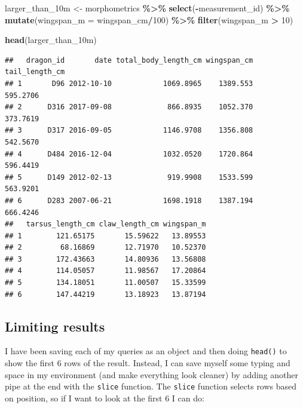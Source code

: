 \documentclass[
]{book}
\newenvironment{Shaded}{\begin{snugshade}}{\end{snugshade}}
\newcommand{\AttributeTok}[1]{\textcolor[rgb]{0.13,0.29,0.53}{#1}}
\newcommand{\DecValTok}[1]{\textcolor[rgb]{0.00,0.00,0.81}{#1}}
\newcommand{\FunctionTok}[1]{\textcolor[rgb]{0.13,0.29,0.53}{\textbf{#1}}}
\newcommand{\NormalTok}[1]{#1}
\newcommand{\OtherTok}[1]{\textcolor[rgb]{0.56,0.35,0.01}{#1}}
\newcommand{\SpecialCharTok}[1]{\textcolor[rgb]{0.81,0.36,0.00}{\textbf{#1}}}
\begin{document}
\begin{Shaded}
\begin{Highlighting}[]
\NormalTok{larger\_than\_10m }\OtherTok{\textless{}{-}}\NormalTok{ morphometrics }\SpecialCharTok{\%\textgreater{}\%} 
  \FunctionTok{select}\NormalTok{(}\SpecialCharTok{{-}}\NormalTok{measurement\_id) }\SpecialCharTok{\%\textgreater{}\%} 
  \FunctionTok{mutate}\NormalTok{(}\AttributeTok{wingspan\_m =}\NormalTok{ wingspan\_cm}\SpecialCharTok{/}\DecValTok{100}\NormalTok{) }\SpecialCharTok{\%\textgreater{}\%} 
  \FunctionTok{filter}\NormalTok{(wingspan\_m }\SpecialCharTok{\textgreater{}} \DecValTok{10}\NormalTok{)}

\FunctionTok{head}\NormalTok{(larger\_than\_10m)}
\end{Highlighting}
\end{Shaded}

\begin{verbatim}
##   dragon_id       date total_body_length_cm wingspan_cm tail_length_cm
## 1       D96 2012-10-10            1069.8965    1389.553       595.2706
## 2      D316 2017-09-08             866.8935    1052.370       373.7619
## 3      D317 2016-09-05            1146.9708    1356.808       542.5670
## 4      D484 2016-12-04            1032.0520    1720.864       596.4419
## 5      D149 2012-02-13             919.9908    1533.599       563.9201
## 6      D283 2007-06-21            1698.1918    1387.194       666.4246
##   tarsus_length_cm claw_length_cm wingspan_m
## 1        121.65175       15.59622   13.89553
## 2         68.16869       12.71970   10.52370
## 3        172.43663       14.80936   13.56808
## 4        114.05057       11.98567   17.20864
## 5        134.18051       11.00507   15.33599
## 6        147.44219       13.18923   13.87194
\end{verbatim}

\hypertarget{limiting-results-1}{%
\subsection{Limiting results}\label{limiting-results-1}}

I have been saving each of my queries as an object and then doing \texttt{head()} to
show the first 6 rows of the result. Instead, I can save myself some typing and
space in my environment (and make everything look cleaner) by adding another
pipe at the end with the \texttt{slice} function. The \texttt{slice} function selects rows
based on position, so if I want to look at the first 6 I can do:
\end{document}
